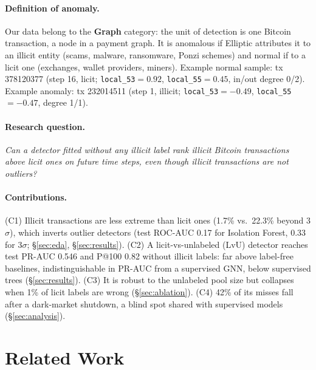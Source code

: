 \documentclass[11pt]{article}
\newcommand{\ours}{LvU}
\begin{document}
\paragraph{Definition of anomaly.}
Our data belong to the \textbf{Graph} category: the unit of detection is one Bitcoin transaction, a node in a payment graph.
It is anomalous if Elliptic attributes it to an illicit entity (scams, malware, ransomware, Ponzi schemes) and normal if to a licit one (exchanges, wallet providers, miners).
Example normal sample: tx 378120377 (step 16, licit; \texttt{local\_53}$=0.92$, \texttt{local\_55}$=0.45$, in/out degree 0/2).
Example anomaly: tx 232014511 (step 1, illicit; \texttt{local\_53}$=-0.49$, \texttt{local\_55}$=-0.47$, degree 1/1).

\paragraph{Research question.}
\emph{Can a detector fitted without any illicit label rank illicit Bitcoin transactions above licit ones on future time steps, even though illicit transactions are not outliers?}

\paragraph{Contributions.}
(C1) Illicit transactions are less extreme than licit ones (1.7\% vs.\ 22.3\% beyond 3$\sigma$), which inverts outlier detectors (test ROC-AUC 0.17 for Isolation Forest, 0.33 for 3$\sigma$; \S\ref{sec:eda}, \S\ref{sec:results}).
(C2) A licit-vs-unlabeled (\ours{}) detector reaches test PR-AUC 0.546 and P@100 0.82 without illicit labels: far above label-free baselines, indistinguishable in PR-AUC from a supervised GNN, below supervised trees (\S\ref{sec:results}).
(C3) It is robust to the unlabeled pool size but collapses when 1\% of licit labels are wrong (\S\ref{sec:ablation}).
(C4) 42\% of its misses fall after a dark-market shutdown, a blind spot shared with supervised models (\S\ref{sec:analysis}).

\section{Related Work}
\end{document}
